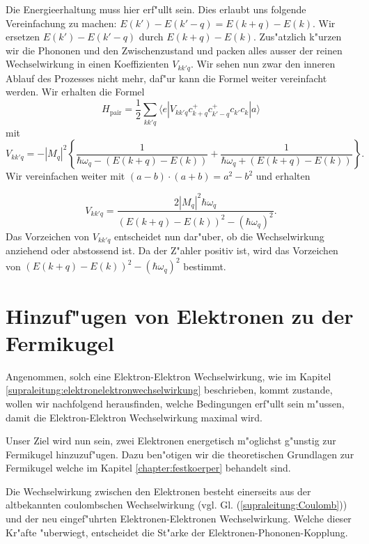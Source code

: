 \begin{refsection}
Die Energieerhaltung muss hier erf"ullt sein. 
Dies erlaubt uns folgende Vereinfachung zu machen:
$E(k')-E(k'-q) = E(k+q)-E(k)$. Wir ersetzen $E(k')-E(k'-q)$ durch $E(k+q)-E(k)$.
Zus"atzlich k"urzen wir die Phononen und den Zwischenzustand und packen
alles ausser der reinen Wechselwirkung in einen Koeffizienten $V_{kk'q}$.
Wir sehen nun zwar den inneren Ablauf des Prozesses nicht mehr, daf"ur kann die Formel
weiter vereinfacht werden.
Wir erhalten die Formel
\begin{equation}
H_{\text{pair}}=
\frac{1}{2}
\sum \limits_{kk'q} 
\langle e|V_{kk'q}c^+_{k+q}c^+_{k'-q}c_{k'}c_k|a \rangle
\label{supraleitung:WechselwirkungKurz}
\end{equation}
mit
\begin{equation}
V_{kk'q} = - |M_q|^2 \left\{
\frac{1}{\hbar\omega_q-(E(k+q)-E(k))}
+
\frac{1}{\hbar\omega_q+(E(k+q)-E(k))}
\right\}
\label{supraleitung:WechselwirkungVkk'q}.
\end{equation}
Wir vereinfachen weiter mit $(a-b)\cdot (a+b) = a^2-b^2$ und erhalten

\begin{equation}
V_{kk'q} =
\frac
{2|M_q|^2\hbar\omega_q}
{(E(k+q)-E(k))^2-(\hbar\omega_q)^2}
\label{supraleitung:Wechselwirkung_Vkk'q_Kurz}.
\end{equation}
Das Vorzeichen von $V_{kk'q}$ entscheidet nun dar"uber, ob die Wechselwirkung
anziehend oder abstossend ist. Da der Z"ahler positiv ist, wird das Vorzeichen von $(E(k+q)-E(k))^2-(\hbar\omega_q)^2$ bestimmt.

\section{Hinzuf"ugen von Elektronen zu der Fermikugel}
Angenommen, solch eine Elektron-Elektron Wechselwirkung, wie im Kapitel
\ref{supraleitung:elektronelektronwechselwirkung} beschrieben, kommt zustande,
wollen wir nachfolgend herausfinden, welche Bedingungen erf"ullt sein m"ussen, damit die
Elektron-Elektron Wechselwirkung maximal wird.

Unser Ziel wird nun sein, zwei Elektronen energetisch m"oglichst g"unstig zur  Fermikugel hinzuzuf"ugen.
Dazu ben"otigen wir die theoretischen Grundlagen zur Fermikugel welche im Kapitel
\ref{chapter:festkoerper} behandelt sind.


Die Wechselwirkung zwischen den Elektronen besteht einerseits aus der altbekannten coulombschen
Wechselwirkung (vgl. Gl. (\ref{supraleitung:Coulomb})) und der neu eingef"uhrten
Elektronen-Elektronen Wechselwirkung.
Welche dieser Kr"afte "uberwiegt, entscheidet die St"arke der Elektronen-Phononen-Kopplung.


\end{refsection}
